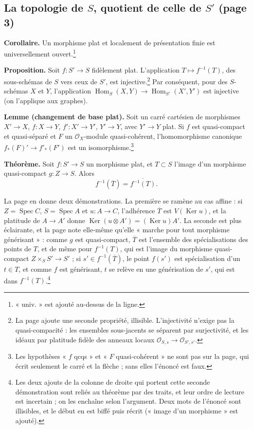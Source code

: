 \documentclass[11pt,a4paper]{article}
\begin{document}
\subsection*{La topologie de $S$, quotient de celle de $S'$ (page 3)}

\textbf{Corollaire.} Un morphisme plat et localement de présentation finie est
universellement ouvert.\footnote{« univ. » est ajouté au-dessus de la ligne.}

\textbf{Proposition.} Soit $f : S' \to S$ fidèlement plat. L'application
$T \mapsto f^{-1}(T)$, des sous-schémas de $S$ vers ceux de $S'$, est
injective.\footnote{La page ajoute une seconde propriété, illisible. L'injectivité
n'exige pas la quasi-compacité : les ensembles sous-jacents se séparent par
surjectivité, et les idéaux par platitude fidèle des anneaux locaux
$\mathcal{O}_{S,s} \to \mathcal{O}_{S',s'}$.} Par conséquent, pour des
$S$-schémas $X$ et $Y$, l'application
$\operatorname{Hom}_S(X, Y) \to \operatorname{Hom}_{S'}(X', Y')$ est injective
(on l'applique aux graphes).

\textbf{Lemme (changement de base plat).} Soit un carré cartésien de
morphismes $X' \to X$, $f : X \to Y$, $f' : X' \to Y'$, $Y' \to Y$, avec
$Y' \to Y$ plat. Si $f$ est quasi-compact et quasi-séparé et $F$ un
$\mathcal{O}_X$-module quasi-cohérent, l'homomorphisme canonique
$f_*(F)' \to f'_*(F')$ est un isomorphisme.\footnote{Les hypothèses « $f$
qcqs » et « $F$ quasi-cohérent » ne sont pas sur la page, qui écrit seulement le
carré et la flèche ; sans elles l'énoncé est faux.}

\textbf{Théorème.} Soit $f : S' \to S$ un morphisme plat, et $T \subset S$
l'image d'un morphisme quasi-compact $g : Z \to S$. Alors
\[
f^{-1}(\overline{T}) = \overline{f^{-1}(T)} .
\]

La page en donne deux démonstrations. La première se ramène au cas affine :
si $Z = \operatorname{Spec} C$, $S = \operatorname{Spec} A$ et
$u : A \to C$, l'adhérence $\overline{T}$ est $V(\operatorname{Ker} u)$, et la
platitude de $A \to A'$ donne
$\operatorname{Ker}(u \otimes A') = (\operatorname{Ker} u) A'$. La seconde
est plus éclairante, et la page note elle-même qu'elle « marche pour tout
morphisme générisant » : comme $g$ est quasi-compact, $\overline{T}$ est
l'ensemble des spécialisations des points de $T$, et de même pour
$f^{-1}(T)$, qui est l'image du morphisme quasi-compact
$Z \times_S S' \to S'$ ; si $s' \in f^{-1}(\overline{T})$, le point $f(s')$
est spécialisation d'un $t \in T$, et comme $f$ est générisant, $t$ se relève
en une générisation de $s'$, qui est dans $f^{-1}(T)$.\footnote{Les deux
ajouts de la colonne de droite qui portent cette seconde démonstration sont
reliés au théorème par des traits, et leur ordre de lecture est incertain ; on
les enchaîne selon l'argument. Deux mots de l'énoncé sont illisibles, et le
début en est biffé puis récrit (« image d'un morphisme » est ajouté).}
\end{document}
